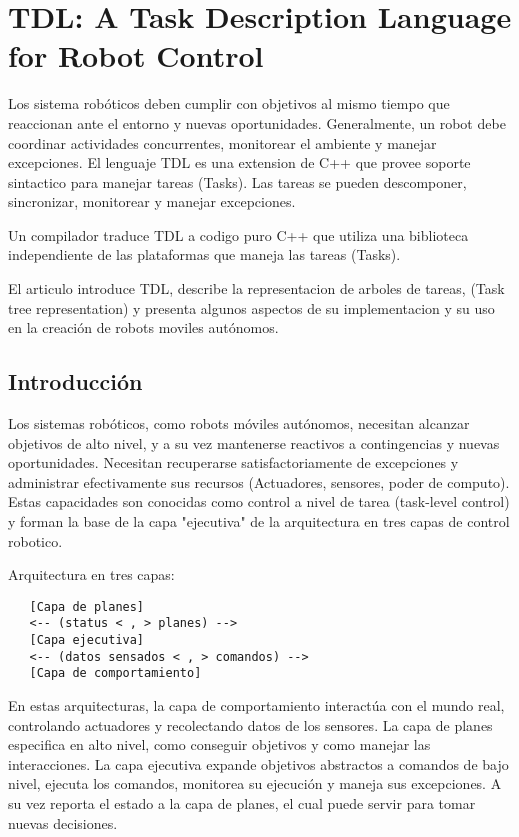 

\section{TDL: A Task Description Language for Robot Control}

Los sistema robóticos deben cumplir con objetivos al mismo tiempo que
reaccionan ante el entorno y nuevas oportunidades.
Generalmente, un robot debe coordinar actividades concurrentes, monitorear el 
ambiente y manejar excepciones.
El lenguaje TDL es una extension de C++ que provee soporte sintactico para 
manejar tareas (Tasks). 
Las tareas se pueden descomponer, sincronizar, monitorear y 
manejar excepciones.

Un compilador traduce TDL a codigo puro C++ que utiliza una biblioteca 
independiente de las plataformas que maneja las tareas (Tasks).

El articulo introduce TDL, describe la representacion de arboles de tareas, 
(Task tree representation) y presenta algunos aspectos de su implementacion 
y su uso en la creación de robots moviles autónomos.

\subsection{Introducción}

Los sistemas robóticos, como robots móviles autónomos, necesitan alcanzar
objetivos de alto nivel, y a su vez mantenerse reactivos a contingencias y
nuevas oportunidades.
Necesitan recuperarse satisfactoriamente de excepciones y administrar
efectivamente sus recursos (Actuadores, sensores, poder de computo).
Estas capacidades son conocidas como control a nivel de tarea
(task-level control) y forman la base de la capa "ejecutiva" de la 
arquitectura en tres capas de control robotico.

Arquitectura en tres capas:

\begin{verbatim}
   [Capa de planes]
   <-- (status < , > planes) -->
   [Capa ejecutiva]
   <-- (datos sensados < , > comandos) -->
   [Capa de comportamiento]
\end{verbatim}


En estas arquitecturas, la capa de comportamiento interactúa con el mundo real,
controlando actuadores y recolectando datos de los sensores.
La capa de planes especifica en alto nivel, como conseguir objetivos y
como manejar las interacciones.
La capa ejecutiva expande objetivos abstractos a comandos de bajo nivel,
ejecuta los comandos, monitorea su ejecución y maneja sus excepciones. A su 
vez reporta el estado a la capa de planes, el cual puede servir para tomar
nuevas decisiones.

